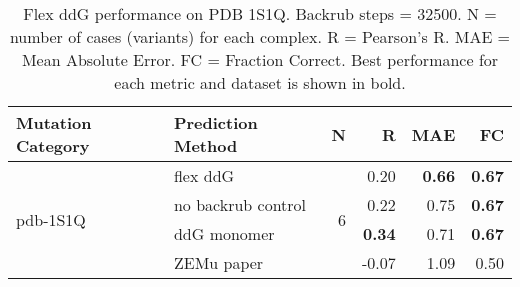\begin{table}
  \begin{tabular}{llrrrr}
\toprule
Mutation Category &   Prediction Method &  N &     R &  MAE &   FC \\
\midrule
 \multirow{ 4}{*}{pdb-1S1Q} & flex ddG & \multirow{ 4}{*}{6} & 0.20 & \textbf{0.66} & \textbf{0.67}  \\
 & no backrub control & & 0.22 & 0.75 & \textbf{0.67}  \\
 & ddG monomer & & \textbf{0.34} & 0.71 & \textbf{0.67}  \\
 & ZEMu paper & & -0.07 & 1.09 & 0.50  \\
\bottomrule
\end{tabular}
  \caption[Flex ddG performance on PDB 1S1Q]{
    Flex ddG performance on PDB 1S1Q. Backrub steps = 32500. N = number of cases (variants) for each complex. R = Pearson's R. MAE = Mean Absolute Error. FC = Fraction Correct. Best performance for each metric and dataset is shown in bold.
  } \label{tab:table-pdb-1S1Q}
\end{table}
